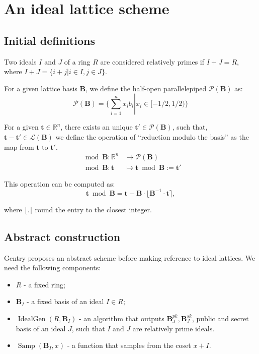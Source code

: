 \chapter{An ideal lattice scheme}
\label{appendixA}
\section{Initial definitions}

\begin{definition}
Two ideals $I$ and $J$ of a ring $R$ are considered relatively primes if $I+J=R$, where $I+J=\{i+j|i\in I,j\in J\}$.
\end{definition}

\begin{definition}
For a given lattice basis $\mathbf B$, we define the half-open parallelepiped $\mathcal P (\mathbf B)$ as:
$$\mathcal P (\mathbf B)=\Big\{\sum_{i=1}^{n}x_ib_i\left|\right. x_i\in [-1/2,1/2)\Big\}$$
\end{definition}

\begin{proposition}
For a given $\mathbf t \in\mathbb{R}^n$, there exists an unique $\mathbf t'\in\mathcal P(\mathbf B)$, such that, $\mathbf t-\mathbf t' \in\mathcal L(\mathbf B)$ we define the operation of ``reduction modulo the basis'' as the map from $\mathbf t$ to $\mathbf t'$.
\begin{align*}
    \mod \mathbf B:\mathbb{R}^n&\to\mathcal P(\mathbf B)\\
    \mod \mathbf B:\mathbf t &\mapsto \mathbf t \bmod \mathbf B := \mathbf t'
\end{align*}

This operation can be computed as:
$$\mathbf t\bmod \mathbf B=\mathbf t-\mathbf B\cdot\lfloor{\mathbf B}^{-1}\cdot\mathbf t\rceil,$$

where $\lfloor.\rceil$ round the entry to the closest integer. \cite{stan16}
\end{proposition}

\section{Abstract construction}
Gentry \cite{gentry2009fully} proposes an abstract scheme before making reference to ideal lattices. We need the following components:

\begin{itemize}
    \item $R$ - a fixed ring;
    \item $\mathbf B_I$ - a fixed basis of an ideal $I\in R$;
    \item $\operatorname{IdealGen}(R,\mathbf B_I)$ - an algorithm that outputs $\mathbf B_{J}^{pk},\mathbf B_{J}^{sk}$, public and secret basis of an ideal $J$, such that $I$ and $J$ are relatively prime ideals.
    \item $\operatorname{Samp}(\mathbf B_I,x)$ - a function that samples from the coset $x+I$.
\end{itemize}

